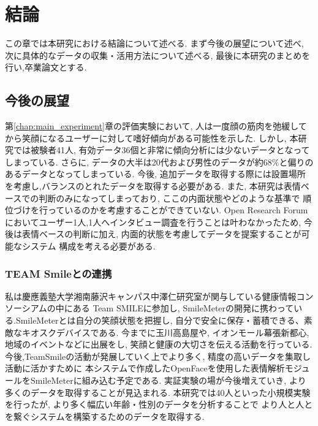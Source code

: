 \chapter{結論}
\label{chap:conclusion}

この章では本研究における結論について述べる.
まず今後の展望について述べ, 次に具体的なデータの収集・活用方法について述べる,
最後に本研究のまとめを行い,卒業論文とする.

\section{今後の展望}
第\ref{chap:main_experiment}章の評価実験において, 人は一度顔の筋肉を弛緩してから笑顔になるユーザーに対して嗜好傾向がある可能性を示した.
しかし, 本研究では被験者41人, 有効データ36個と非常に傾向分析には少ないデータとなってしまっている.
さらに, データの大半は20代および男性のデータが約68\%と偏りのあるデータとなってしまっている.
今後, 追加データを取得する際には設置場所を考慮し,バランスのとれたデータを取得する必要がある.
また, 本研究は表情ベースでの判断のみになってしまっており, ここの内面状態やどのような基準で
順位づけを行っているのかを考慮することができていない.
Open Research Forum においてユーザー1人,1人へインタビュー調査を行うことは叶わなかったため,
今後は表情ベースの判断に加え, 内面的状態を考慮してデータを提案することが可能なシステム
構成を考える必要がある.

\subsection{TEAM Smileとの連携}
私は慶應義塾大学湘南藤沢キャンパス中澤仁研究室が関与している健康情報コンソーシアムの中にある
Team SMILEに参加し, SmileMeterの開発に携わっている.\cite{teamSMILE}SmileMeterとは自分の笑顔状態を把握し,
自分で安全に保存・蓄積できる、素敵なキオスクデバイスである.
今までに玉川高島屋や, イオンモール幕張新都心, 地域のイベントなどに出展をし,
笑顔と健康の大切さを伝える活動を行っている.
今後,TeamSmileの活動が発展していく上でより多く, 精度の高いデータを集取し活動に活かすために
本システムで作成したOpenFaceを使用した表情解析モジュールをSmileMeterに組み込む予定である.
実証実験の場が今後増えていき, より多くのデータを取得することが見込まれる.
本研究では40人といった小規模実験を行ったが,  より多く幅広い年齢・性別のデータを分析することで
より人と人とを繋ぐシステムを構築するためのデータを取得する.

